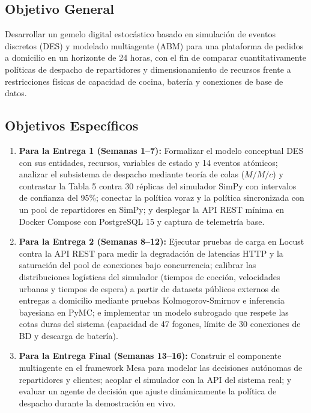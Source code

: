 \documentclass[11pt,letterpaper]{article}
\begin{document}
\subsection{Objetivo General}
Desarrollar un gemelo digital estocástico basado en simulación de eventos discretos (DES) y modelado multiagente (ABM) para una plataforma de pedidos a domicilio en un horizonte de 24 horas, con el fin de comparar cuantitativamente políticas de despacho de repartidores y dimensionamiento de recursos frente a restricciones físicas de capacidad de cocina, batería y conexiones de base de datos.

\subsection{Objetivos Específicos}
\begin{enumerate}[leftmargin=1.5em, itemsep=0.3em]
    \item \textbf{Para la Entrega 1 (Semanas 1–7):} Formalizar el modelo conceptual DES con sus entidades, recursos, variables de estado y 14 eventos atómicos; analizar el subsistema de despacho mediante teoría de colas ($M/M/c$) y contrastar la Tabla 5 contra 30 réplicas del simulador SimPy con intervalos de confianza del 95\%; conectar la política voraz y la política sincronizada con un pool de repartidores en SimPy; y desplegar la API REST mínima en Docker Compose con PostgreSQL 15 y captura de telemetría base.
    \item \textbf{Para la Entrega 2 (Semanas 8–12):} Ejecutar pruebas de carga en Locust contra la API REST para medir la degradación de latencias HTTP y la saturación del pool de conexiones bajo concurrencia; calibrar las distribuciones logísticas del simulador (tiempos de cocción, velocidades urbanas y tiempos de espera) a partir de datasets públicos externos de entregas a domicilio mediante pruebas Kolmogorov-Smirnov e inferencia bayesiana en PyMC; e implementar un modelo subrogado que respete las cotas duras del sistema (capacidad de 47 fogones, límite de 30 conexiones de BD y descarga de batería).
    \item \textbf{Para la Entrega Final (Semanas 13–16):} Construir el componente multiagente en el framework Mesa para modelar las decisiones autónomas de repartidores y clientes; acoplar el simulador con la API del sistema real; y evaluar un agente de decisión que ajuste dinámicamente la política de despacho durante la demostración en vivo.
\end{enumerate}
\end{document}
